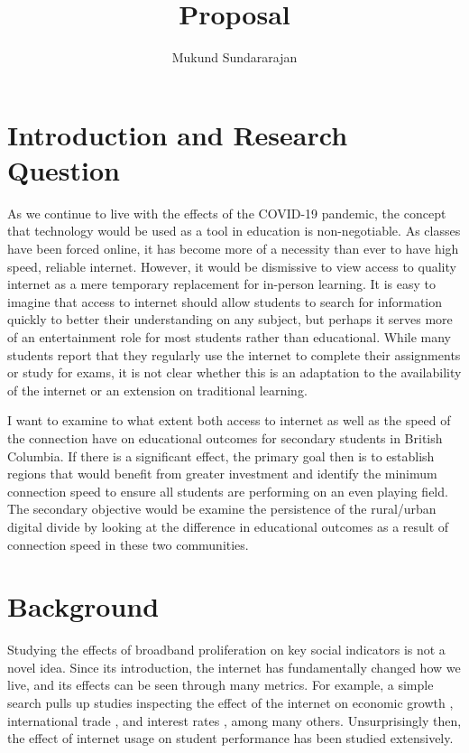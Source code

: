 \documentclass[12pt]{article}
\title{Proposal}
\author{Mukund Sundararajan}
\begin{document}
    \maketitle

    \section*{Introduction and Research Question}
    As we continue to live with the effects of the COVID-19 pandemic, the concept that technology would be used as a tool in education is non-negotiable. As classes have been forced online, it has become more of a necessity than ever to have high speed, reliable internet. However, it would be dismissive to view access to quality internet as a mere temporary replacement for in-person learning. It is easy to imagine that access to internet should allow students to search for information quickly to better their understanding on any subject, but perhaps it serves more of an entertainment role for most students rather than educational. While many students report that they regularly use the internet to complete their assignments or study for exams, it is not clear whether this is an adaptation to the availability of the internet or an extension on traditional learning.

    I want to examine to what extent both access to internet as well as the speed of the connection have on educational outcomes for secondary students in British Columbia. If there is a significant effect, the primary goal then is to establish regions that would benefit from greater investment and identify the minimum connection speed to ensure all students are performing on an even playing field. The secondary objective would be examine the persistence of the rural/urban digital divide by looking at the difference in educational outcomes as a result of connection speed in these two communities. 

    \section*{Background}
    Studying the effects of broadband proliferation on key social indicators is not a novel idea. Since its introduction, the internet has fundamentally changed how we live, and its effects can be seen through many metrics. For example, a simple search pulls up studies inspecting the effect of the internet on economic growth \cite{CHOI200939}, international trade \cite{Lin2015}, and interest rates \cite{Luo2018}, among many others. Unsurprisingly then, the effect of internet usage on student performance has been studied extensively. 
\end{document}
